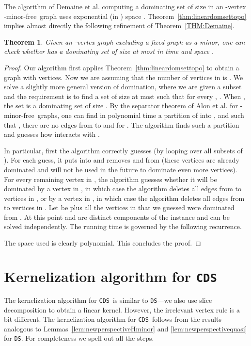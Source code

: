\documentclass[11pt]{article}
\newtheorem{theorem}{Theorem}
\newcommand{\Hmf}{-minor-free}
\newcommand{\tDS}{{\texttt{\sc DS}}}
\newcommand{\tCDS}{{\texttt{\sc CDS}}}
\begin{document}
The algorithm of Demaine et al. \cite{DemaineHaj05} computing a dominating set of size  in an  -vertex  \Hmf \, graph uses exponential (in ) space
. 
Theorem~\ref{thm:lineardomsettopo} implies almost directly the following refinement of Theorem~\ref{THM:Demaine}.
  \begin{theorem} 
 Given an -vertex  graph  excluding a fixed graph  as a minor,  one  can check whether  has a dominating set of size at most  in time 
 and space . 
\end{theorem}
\begin{proof} 


Our algorithm first applies Theorem~\ref{thm:lineardomsettopo} to obtain a graph with  vertices.
Now we are assuming that the number of vertices in  is . 
We solve a slightly more general version of domination, where we are   given a subset  and the requirement is to find a set  of size at most    such that for every , . When , the set  is a dominating set of size .
By the separator theorem of Alon et al.  \cite{AlonST90}
 for \Hmf \, graphs, one can find in polynomial time a partition of  into ,  and  such that , there are no edges from  to  and  for . The algorithm finds such a partition and guesses how  interacts with . 

In particular, first the algorithm correctly guesses  (by looping over all subsets of ). For each guess, it puts  into  and removes  and  from  (these vertices are already dominated and will not be used in the future to dominate even more vertices). For every remaining vertex  in , the algorithm guesses whether it will be dominated by a vertex in , in which case the algorithm deletes all edges from  to vertices in , or by a vertex in , in which case the algorithm deletes all edges from  to vertices in . Let  be  plus all the vertices in  that we guessed were dominated from . At this point  and  are distinct components of the instance and can be solved independently. The running time is governed by the following recurrence.

The space used is clearly polynomial. This concludes the proof.
\end{proof}




\section{Kernelization algorithm for \tCDS}\label{sec:CDSkernel}
The kernelization algorithm for \tCDS \, is   similar to \tDS---we also  use slice decomposition to obtain a 
linear kernel.  However, the irrelevant vertex rule is a bit different. 
The  kernelization algorithm for \tCDS \, follows from the  results 
analogous to  Lemmas~\ref{lem:newperspectiveHminor} and \ref{lem:newperspectivequasi} for \tDS.  For completeness we spell out all the steps. 
\end{document}
